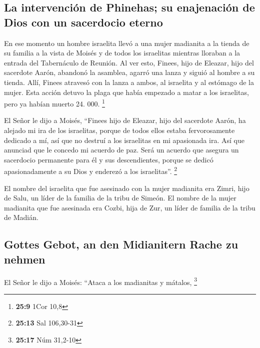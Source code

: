\hypertarget{la-intervenciuxf3n-de-phinehas-su-enajenaciuxf3n-de-dios-con-un-sacerdocio-eterno}{%
\subsection{La intervención de Phinehas; su enajenación de Dios con un
sacerdocio
eterno}\label{la-intervenciuxf3n-de-phinehas-su-enajenaciuxf3n-de-dios-con-un-sacerdocio-eterno}}

 En ese momento un hombre israelita llevó a una mujer
madianita a la tienda de su familia a la vista de Moisés y de todos los
israelitas mientras lloraban a la entrada del Tabernáculo de Reunión.
 Al ver esto, Finees, hijo de Eleazar, hijo del sacerdote
Aarón, abandonó la asamblea, agarró una lanza  y siguió al
hombre a su tienda. Allí, Finees atravesó con la lanza a ambos, al
israelita y al estómago de la mujer. Esta acción detuvo la plaga que
había empezado a matar a los israelitas,  pero ya habían
muerto 24. 000. \footnote{\textbf{25:9} 1Cor 10,8}

 El Señor le dijo a Moisés,  ``Finees hijo
de Eleazar, hijo del sacerdote Aarón, ha alejado mi ira de los
israelitas, porque de todos ellos estaba fervorosamente dedicado a mí,
así que no destruí a los israelitas en mi apasionada ira.
 Así que anunciad que le concedo mi acuerdo de paz.
 Será un acuerdo que asegura un sacerdocio permanente
para él y sus descendientes, porque se dedicó apasionadamente a su Dios
y enderezó a los israelitas''. \footnote{\textbf{25:13} Sal 106,30-31}

 El nombre del israelita que fue asesinado con la mujer
madianita era Zimri, hijo de Salu, un líder de la familia de la tribu de
Simeón.  El nombre de la mujer madianita que fue
asesinada era Cozbi, hija de Zur, un líder de familia de la tribu de
Madián.

\hypertarget{gottes-gebot-an-den-midianitern-rache-zu-nehmen}{%
\subsection{Gottes Gebot, an den Midianitern Rache zu
nehmen}\label{gottes-gebot-an-den-midianitern-rache-zu-nehmen}}

 El Señor le dijo a Moisés:  ``Ataca a los
madianitas y mátalos, \footnote{\textbf{25:17} Núm 31,2-10}

